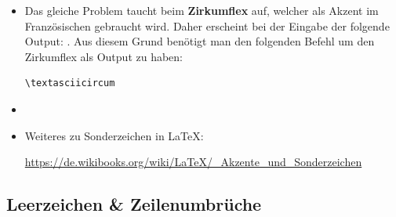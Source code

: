 \begin{frame}[fragile]

\begin{itemize}
\item Das gleiche Problem taucht beim \textbf{Zirkumflex}  \gqq{\textasciicircum} auf, welcher als Akzent \zB im Französischen gebraucht wird. Daher erscheint bei der Eingabe  der folgende Output: . Aus diesem Grund benötigt man den folgenden Befehl um den Zirkumflex als Output zu haben:

\begin{lstlisting}
\textasciicircum
\end{lstlisting}

\item[]

\item Weiteres zu Sonderzeichen in \LaTeX :

\url{https://de.wikibooks.org/wiki/LaTeX/_Akzente_und_Sonderzeichen}

\end{itemize}

\end{frame}


\subsection{Leerzeichen \& Zeilenumbrüche}

